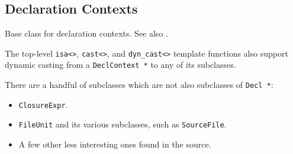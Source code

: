 \documentclass[../generics]{subfiles}
\begin{document}
\subsection*{Declaration Contexts}

Base class for declaration contexts. See also .

The top-level \verb|isa<>|, \verb|cast<>|, and \verb|dyn_cast<>| template functions also support dynamic casting from a \texttt{DeclContext *} to any of its subclasses.

\pagebreak

There are a handful of subclasses which are not also subclasses of \texttt{Decl *}:
\begin{itemize}
\item \texttt{ClosureExpr}.
\item \texttt{FileUnit} and its various subclasses, such as \texttt{SourceFile}.
\item A few other less interesting ones found in the source.
\end{itemize}
\end{document}
